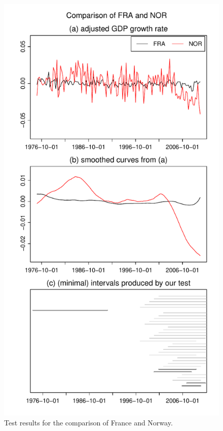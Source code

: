 \documentclass[12pt]{article}
\begin{document}
\begin{figure}
\begin{minipage}[t]{0.24\textwidth}
\includegraphics[width=\textwidth]{../output/plots/gdp/FRA_vs_NOR}
\caption{Test results for the comparison of France and Norway.}\label{fig:France:Norway}
\end{minipage}
\hspace{0.1cm}
\begin{minipage}[t]{0.24\textwidth}

\end{minipage}
\end{figure}
\end{document}
